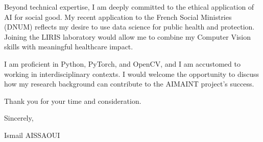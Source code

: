 \documentclass[11pt,a4paper]{article}
\begin{document}
Beyond technical expertise, I am deeply committed to the ethical application of AI for social good. My recent application to the French Social Ministries (DNUM) reflects my desire to use data science for public health and protection. Joining the LIRIS laboratory would allow me to combine my Computer Vision skills with meaningful healthcare impact.

I am proficient in Python, PyTorch, and OpenCV, and I am accustomed to working in interdisciplinary contexts. I would welcome the opportunity to discuss how my research background can contribute to the AIMAINT project's success.

Thank you for your time and consideration.

\bigskip

\noindent Sincerely,

\bigskip

\noindent Ismail AISSAOUI
\end{document}
